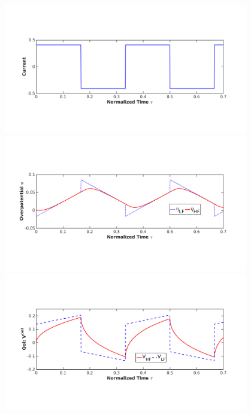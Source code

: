 \documentclass[10pt,xcolor=dvipsnames,compress]{beamer}
\begin{document}
\begin{frame}
\begin{columns}
\begin{column}{.47\textwidth}
\end{column}
\begin{column}{.53\textwidth}
\begin{center}
\begin{figure}[h]
    \centering
    \includegraphics[trim = 1.2in 2.4in 1.6in 2.8in, clip, width=1\textwidth]{figs/I.png}
    \\
    \includegraphics[trim = 1.2in 2.4in 1.6in 2.8in, clip, width=1\textwidth]{figs/etaLF_HF.png}   
    \\
    \includegraphics[trim = 1.2in 2.4in 1.6in 2.8in, clip, width=1\textwidth]{figs/Vcell_HF_LF.png} 
\end{figure}
\end{center}
\end{column}
\end{columns}


\vfill
\end{frame}
\end{document}
